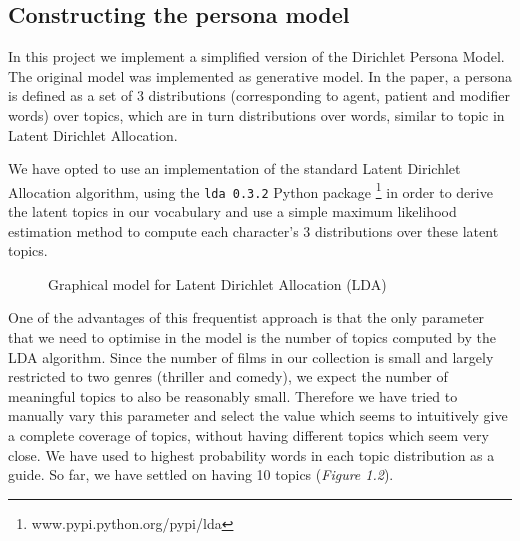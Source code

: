 \documentclass[bsc,frontabs,singlespacing,parskip, twoside]{infthesis}
\begin{document}
\subsection{Constructing the persona model}
In this project we implement a simplified version of the Dirichlet Persona Model. The original model was implemented as generative model. In the paper, a persona is defined as a set of 3 distributions (corresponding to agent, patient and modifier words) over topics, which are in turn distributions over words, similar to topic in Latent Dirichlet Allocation.

We have opted to use an implementation of the standard Latent Dirichlet Allocation \cite{Blei2003} algorithm, using the \texttt{lda 0.3.2} Python package \footnote{ www.pypi.python.org/pypi/lda} in order to derive the latent topics in our vocabulary and use a simple maximum likelihood estimation method to compute each character's 3 distributions over these latent topics.

\begin{figure}[h!]
\centering
{}
\caption{Graphical model for Latent Dirichlet Allocation (LDA)}
\label{fig:lda}
\end{figure}

One of the advantages of this frequentist approach is that the only parameter that we need to optimise in the model is the number of topics computed by the LDA algorithm. Since the number of films in our collection is small and largely restricted to two genres (thriller and comedy), we expect the number of meaningful topics to also be reasonably small. Therefore we have tried to manually vary this parameter and select the value which seems to intuitively give a complete coverage of topics, without having different topics which seem very close. We have used to highest probability words in each topic distribution as a guide. So far, we have settled on having 10 topics (\textit{Figure 1.2}).
\end{document}
